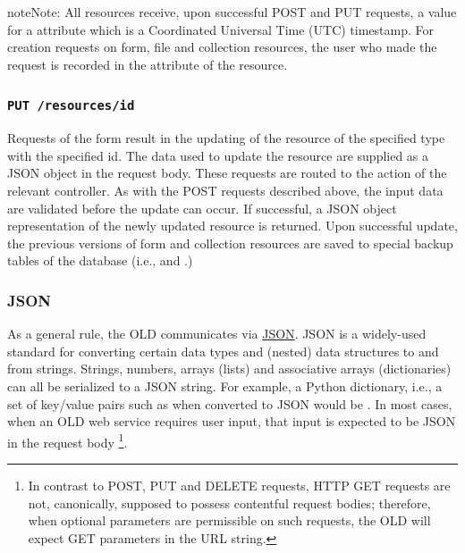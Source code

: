 \documentclass[letterpaper,10pt,english]{sphinxmanual}
\begin{document}
\begin{notice}{note}{Note:}
All resources receive, upon successful POST and PUT requests, a value for a
 attribute which is a Coordinated Universal Time (UTC)
timestamp.  For creation requests on form, file and collection resources, the
user who made the request is recorded in the  attribute of the
resource.
\end{notice}


\subsubsection{\texttt{PUT /resources/id}}
\label{interface:put-resources-id}
Requests of the form  result in the updating of the
resource of the specified type with the specified id.  The data used to update
the resource are supplied as a JSON object in the request body.  These requests
are routed to the  action of the relevant controller.  As with the
POST requests described above, the input data are validated before the update
can occur.  If successful, a JSON object representation of the newly updated
resource is returned.  Upon successful update, the previous versions of form and
collection resources are saved to special backup tables of the database (i.e.,
 and .)


\subsubsection{JSON}
\label{interface:json}
As a general rule, the OLD communicates via \href{http://www.json.org/}{JSON}.
JSON is a widely-used standard for converting certain data types and (nested)
data structures to and from strings.  Strings, numbers, arrays (lists) and
associative arrays (dictionaries) can all be serialized to a JSON string.  For
example, a Python dictionary, i.e., a set of key/value pairs such as
 when
converted to JSON would be
.
In most cases, when an OLD web service requires user input, that input is
expected to be JSON in the request body \footnote{
In contrast to POST, PUT and DELETE requests, HTTP GET requests are
not, canonically, supposed to possess contentful request bodies; therefore,
when optional parameters are permissible on such requests, the OLD will
expect GET parameters in the URL string.
}.
\end{document}
